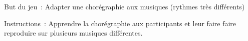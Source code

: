 \documentclass{grand-jeu}
\begin{document}
\begin{liste-materiel}
\end{liste-materiel}

\begin{regles}
But du jeu : Adapter une chorégraphie aux musiques (rythmes très différents)

\vspace{0.2cm}

Instructions : Apprendre la chorégraphie aux participants et leur faire faire reproduire sur plusieurs musiques différentes.
\end{regles}

\begin{imaginaire}

\end{imaginaire}

\begin{moments-stop}
\end{moments-stop}
\end{document}
